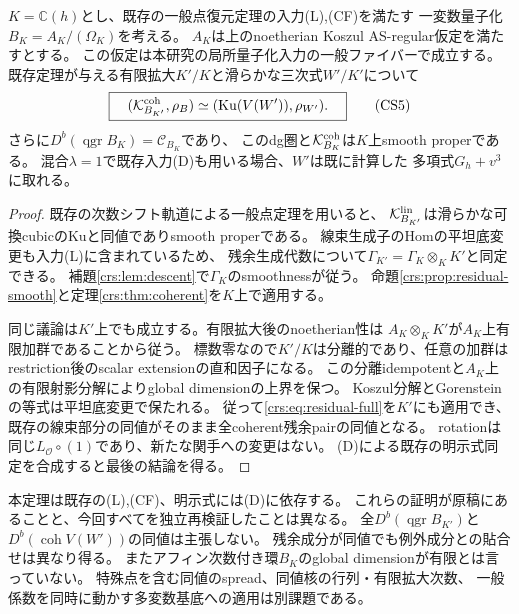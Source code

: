 \begin{theorem}[全coherent残余pairの幾何学的一般点復元]
\label{crs:thm:generic}
$K=\mathbb C(h)$とし、既存の一般点復元定理の入力\textup{(L),(CF)}を満たす
一変数量子化$B_K=A_K/(\Omega_K)$を考える。
$A_K$は上のnoetherian Koszul AS-regular仮定を満たすとする。
この仮定は本研究の局所量子化入力の一般ファイバーで成立する。
既存定理が与える有限拡大$K'/K$と滑らかな三次式$W'/K'$について
\[
 \boxed{\quad
 (\mathcal K^{\rm coh}_{B_{K'}},\rho_B)
 \simeq(\operatorname{Ku}(V(W')),\rho_{W'}).
 \quad}\tag{CS5}\label{crs:eq:generic}
\]
さらに$D^b(\operatorname{qgr}B_K)=\mathcal C_{B_K}$であり、
このdg圏と$\mathcal K^{\rm coh}_{B_K}$は$K$上smooth properである。
混合$\lambda=1$で既存入力\textup{(D)}も用いる場合、$W'$は既に計算した
多項式$G_h+v^3$に取れる。
\end{theorem}
\begin{proof}
既存の次数シフト軌道による一般点定理を用いると、
$\mathcal K^{\rm lin}_{B_{K'}}$は滑らかな可換cubicのKuと同値でありsmooth properである。
線束生成子のHomの平坦底変更も入力(L)に含まれているため、
残余生成代数について$\Gamma_{K'}=\Gamma_K\otimes_KK'$と同定できる。
補題\ref{crs:lem:descent}で$\Gamma_K$のsmoothnessが従う。
命題\ref{crs:prop:residual-smooth}と定理\ref{crs:thm:coherent}を$K$上で適用する。

同じ議論は$K'$上でも成立する。有限拡大後のnoetherian性は
$A_K\otimes_KK'$が$A_K$上有限加群であることから従う。
標数零なので$K'/K$は分離的であり、任意の加群は
restriction後のscalar extensionの直和因子になる。
この分離idempotentと$A_K$上の有限射影分解によりglobal dimensionの上界を保つ。
Koszul分解とGorensteinの等式は平坦底変更で保たれる。
従って\eqref{crs:eq:residual-full}を$K'$にも適用でき、
既存の線束部分の同値がそのまま全coherent残余pairの同値となる。
rotationは同じ$L_{\mathcal O}\circ(1)$であり、新たな関手への変更はない。
(D)による既存の明示式同定を合成すると最後の結論を得る。
\end{proof}

\begin{remark}[主張の境界]
本定理は既存の(L),(CF)、明示式には(D)に依存する。
これらの証明が原稿にあることと、今回すべてを独立再検証したことは異なる。
全$D^b(\operatorname{qgr}B_{K'})$と$D^b(\operatorname{coh}V(W'))$の同値は主張しない。
残余成分が同値でも例外成分との貼合せは異なり得る。
またアフィン次数付き環$B_K$のglobal dimensionが有限とは言っていない。
特殊点を含む同値のspread、同値核の行列・有限拡大次数、
一般係数を同時に動かす多変数基底への適用は別課題である。
\end{remark}

